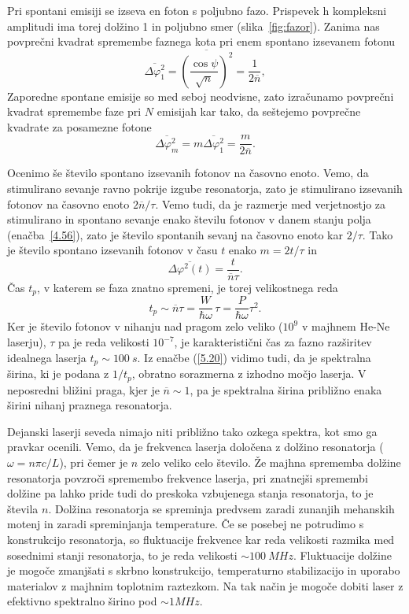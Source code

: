 Pri spontani emisiji se izseva en foton s poljubno fazo. Prispevek h kompleksni
amplitudi ima torej dolžino 1 in poljubno smer (slika~\ref{fig:fazor}). Zanima
nas povprečni kvadrat spremembe faznega kota pri enem spontano izsevanem fotonu
\begin{equation}
\overline{\Delta \varphi_{1}^{2}}=\overline{\left(\frac{\cos\psi}{\sqrt{n} }\right)^2}
=\frac{1}{2\overline{n}},
\label{5.17}
\end{equation}
Zaporedne spontane emisije so med seboj neodvisne, zato izračunamo
povprečni kvadrat spremembe faze pri $N$ emisijah kar tako, da seštejemo
povprečne kvadrate za posamezne fotone 
\begin{equation}
\overline{\Delta \varphi_{m}^{2}}=m\overline{\Delta \varphi_{1}^{2}}=
\frac{m}{2\overline{n}}.
\label{5.18}
\end{equation}

Ocenimo še število spontano izsevanih fotonov na časovno enoto.
Vemo, da stimulirano sevanje ravno pokrije izgube resonatorja, zato je
stimulirano izsevanih fotonov na časovno enoto $2\overline{n}/\tau $. Vemo tudi, 
da je razmerje med verjetnostjo za stimulirano in spontano sevanje enako 
številu fotonov v danem stanju polja (enačba~\ref{4.56}), zato je število 
spontanih sevanj na časovno enoto kar $2/\tau $.
Tako je število spontano izsevanih fotonov v času $t$ enako $m=2t/\tau $ in 
\begin{equation}
\overline{\Delta \varphi^{2}(t)}=\frac{t}{\overline{n}\tau }.
\label{5.19}
\end{equation}
Čas $t_{p}$, v katerem se faza znatno spremeni, je torej
velikostnega reda 
\begin{equation}
t_{p}\sim \overline{n}\tau =\frac{W}{\hbar \omega }\,\tau =\frac{P}{\hbar
\omega }\tau ^{2}.
\label{5.20}
\end{equation}
Ker je število fotonov v nihanju nad pragom zelo veliko ($10^9$ v majhnem 
He-Ne laserju), $\tau$ pa je reda velikosti $10^{-7}$, je karakteristični
čas za fazno razširitev idealnega laserja $t_p \sim 100~\si{s}$. 
Iz enačbe (\ref{5.20}) vidimo tudi, da je spektralna širina, ki je
podana z $1/t_{p}$, obratno sorazmerna z izhodno močjo laserja. 
V neposredni bližini praga, kjer je $\overline{n}\sim 1$, pa je 
spektralna širina približno enaka širini nihanj praznega resonatorja.

Dejanski laserji seveda nimajo niti približno tako ozkega spektra, kot smo ga
pravkar ocenili. Vemo, da je frekvenca laserja določena z dolžino resonatorja 
($\omega=n\pi c/L$), pri čemer je $n$ zelo veliko celo število. Že majhna
sprememba dolžine resonatorja povzroči spremembo frekvence laserja, pri 
znatnejši spremembi dolžine pa lahko pride tudi do preskoka vzbujenega
stanja resonatorja, to je števila $n$. Dolžina resonatorja se 
spreminja predvsem zaradi zunanjih mehanskih motenj in zaradi spreminjanja
temperature. Če se posebej ne potrudimo s konstrukcijo resonatorja, so 
fluktuacije frekvence kar reda velikosti razmika med sosednimi stanji 
resonatorja, to je reda velikosti $\sim 100~\si{MHz}$. 
Fluktuacije dolžine je mogoče zmanjšati s skrbno konstrukcijo, 
temperaturno stabilizacijo in uporabo materialov z majhnim toplotnim raztezkom. 
Na tak način je mogoče dobiti laser z efektivno spektralno širino pod $\sim 1\si{MHz}$.

